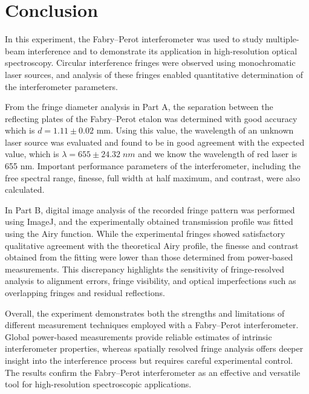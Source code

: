 \section{Conclusion}
In this experiment, the Fabry--Perot interferometer was used to study multiple-beam interference and to demonstrate its application in high-resolution optical spectroscopy. Circular interference fringes were observed using monochromatic laser sources, and analysis of these fringes enabled quantitative determination of the interferometer parameters.

From the fringe diameter analysis in Part A, the separation between the reflecting plates of the Fabry--Perot etalon was determined with good accuracy which is $d = 1.11 \pm 0.02$ mm. Using this value, the wavelength of an unknown laser source was evaluated and found to be in good agreement with the expected value, which is $\lambda = 655 \pm 24.32\;nm$ and we know the wavelength of red laser is 655 nm. Important performance parameters of the interferometer, including the free spectral range, finesse, full width at half maximum, and contrast, were also calculated.

In Part B, digital image analysis of the recorded fringe pattern was performed using ImageJ, and the experimentally obtained transmission profile was fitted using the Airy function. While the experimental fringes showed satisfactory qualitative agreement with the theoretical Airy profile, the finesse and contrast obtained from the fitting were lower than those determined from power-based measurements. This discrepancy highlights the sensitivity of fringe-resolved analysis to alignment errors, fringe visibility, and optical imperfections such as overlapping fringes and residual reflections.

Overall, the experiment demonstrates both the strengths and limitations of different measurement techniques employed with a Fabry--Perot interferometer. Global power-based measurements provide reliable estimates of intrinsic interferometer properties, whereas spatially resolved fringe analysis offers deeper insight into the interference process but requires careful experimental control. The results confirm the Fabry--Perot interferometer as an effective and versatile tool for high-resolution spectroscopic applications.
